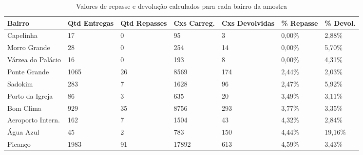 \begin{spacing}{1}
\begin{table}[H]
    \caption{Valores de repasse e devolução calculados para cada bairro da amostra}
    \begin{tabular}{|p{3.3cm}p{1.5cm}p{1.5cm}p{1.5cm}p{1.5cm}p{1.5cm}p{1.5cm}|}
    \hline
    \rowcolor[HTML]{BFBFBF} 
    {\color[HTML]{000000} Bairro} &
      {\color[HTML]{000000} Qtd Entregas} &
      {\color[HTML]{000000} Qtd Repasses} &
      {\color[HTML]{000000} Cxs Carreg.} &
      {\color[HTML]{000000} Cxs Devolvidas} &
      {\color[HTML]{000000} \% Repasse} &
      {\color[HTML]{000000} \% Devol.} \\ \hline
    Capelinha          & 17   & 0   & 95     & 3    & 0,00\%  & 2,88\%  \\
    Morro Grande       & 28   & 0   & 254    & 14   & 0,00\%  & 5,70\%  \\
    Várzea do Palácio  & 16   & 0   & 193    & 8    & 0,00\%  & 4,31\%  \\
    Ponte Grande       & 1065 & 26  & 8569   & 174  & 2,44\%  & 2,03\%  \\
    Sadokim            & 283  & 7   & 1628   & 96   & 2,47\%  & 5,92\%  \\
    Porto da Igreja    & 86   & 3   & 635    & 20   & 3,49\%  & 3,11\%  \\
    Bom Clima          & 929  & 35  & 8756   & 293  & 3,77\%  & 3,35\%  \\
    Aeroporto Intern.  & 162  & 7   & 1504   & 43   & 4,32\%  & 2,84\%  \\
    Água Azul          & 45   & 2   & 783    & 150  & 4,44\%  & 19,16\% \\
    Picanço            & 1983 & 91  & 17892  & 613  & 4,59\%  & 3,43\%  \\

\end{tabular}
\end{table}
\end{spacing}
